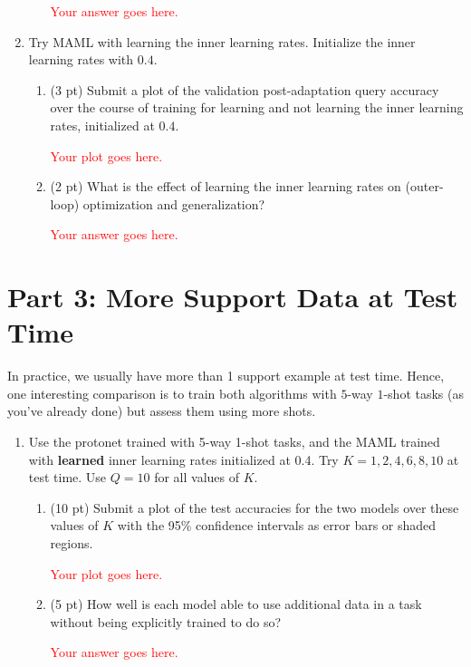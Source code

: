 \documentclass[12pt]{article}
\begin{document}
\begin{enumerate}
\begin{enumerate}[label=(\alph*)]
        \textcolor{red}{Your answer goes here.}

    \end{enumerate}

    \newpage
    \item Try MAML with learning the inner learning rates. Initialize the inner learning rates with $0.4$.
    \begin{enumerate}[label=(\alph*)]
        \item (3 pt) Submit a plot of the validation post-adaptation query accuracy over the course of training for learning and not learning the inner learning rates, initialized at $0.4$. 

        \textcolor{red}{Your plot goes here.}

        \item (2 pt) What is the effect of learning the inner learning rates on (outer-loop) optimization and generalization?

        \textcolor{red}{Your answer goes here.}

    \end{enumerate}
\end{enumerate}

\newpage
\section*{Part 3: More Support Data at Test Time}

In practice, we usually have more than 1 support example at test time. Hence, one interesting comparison is to train both algorithms with $5$-way $1$-shot tasks (as you've already done) but assess them using more shots.

\begin{enumerate}
    \item Use the protonet trained with 5-way 1-shot tasks, and the MAML trained with \textbf{learned} inner learning rates initialized at 0.4. Try $K = 1, 2, 4, 6, 8, 10$ at test time. Use $Q = 10$ for all values of $K$. 
    \begin{enumerate}
        \item (10 pt) Submit a plot of the test accuracies for the two models over these values of $K$ with the 95\% confidence intervals as error bars or shaded regions. 

        \textcolor{red}{Your plot goes here.}

        
        \item (5 pt) How well is each model able to use additional data in a task without being explicitly trained to do so?

        \textcolor{red}{Your answer goes here.}

    \end{enumerate}
\end{enumerate}
\end{document}

